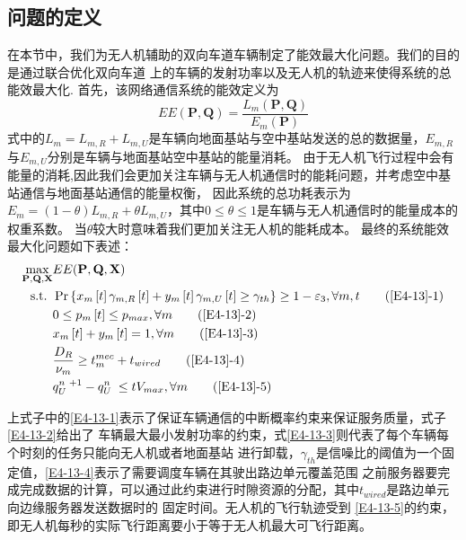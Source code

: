 \subsection{问题的定义}\label{section4-2-3}
在本节中，我们为无人机辅助的双向车道车辆制定了能效最大化问题。我们的目的是通过联合优化双向车道
上的车辆的发射功率以及无人机的轨迹来使得系统的总能效最大化.
首先，该网络通信系统的能效定义为
\begin{equation} \label{E4-12}
EE(\mathbf{P}, \mathbf{Q})=
{\frac{{{L}_{m}}\left( \mathbf{P}, \mathbf{Q} \right)}
{{{E}_{m}}\left( \mathbf{P} \right)}}
\end{equation}
式中的${{L}_{m}={L}_{m,R}+{L}_{m,U}}$是车辆向地面基站与空中基站发送的总的数据量，${E}_{m,R}$与${E}_{m,U}$分别是车辆与地面基站空中基站的能量消耗。
由于无人机飞行过程中会有能量的消耗,因此我们会更加关注车辆与无人机通信时的能耗问题，并考虑空中基站通信与地面基站通信的能量权衡，
因此系统的总功耗表示为${{E}_{m}=(1-\theta){L}_{m,R}+\theta{L}_{m,U}}$，其中$0\le \theta \le 1$是车辆与无人机通信时的能量成本的权重系数。
当$\theta$较大时意味着我们更加关注无人机的能耗成本。
最终的系统能效最大化问题如下表述：
\begin{align}
\max _{ \mathbf{P}, \mathbf{Q}, \mathbf{X} }  & EE(\mathbf{P}, \mathbf{Q}, \mathbf{X})                \label{E4-13}\\
\text { s.t. }
& \Pr\left\{x_m\left[t\right]\gamma_{m,R}\left[t\right]+
y_m\left[t\right]\gamma_{m,U}\left[t\right]\geq \gamma_{th}\right\}\geq1-
\varepsilon_3, \forall m,t                                               \tag{\ref{E4-13}{-1}}      \label{E4-13-1}\\  %
& 0\le p_m\left[t\right]\le p_{max}, \forall m                           \tag{\ref{E4-13}{-2}}      \label{E4-13-2}\\  %
& x_m\left[t\right] + y_m\left[t\right]=1, \forall m                     \tag{\ref{E4-13}{-3}}      \label{E4-13-3}\\  %
& \frac{D_R}{\nu_m} \geq t_{m}^{mec}+t_{wired}                           \tag{\ref{E4-13}{-4}}      \label{E4-13-4}\\  %
& q_U^{n\mathrm{\ }+1}-q_U^{n\mathrm{\ }}\le tV_{max}, \forall m         \tag{\ref{E4-13}{-5}}      \label{E4-13-5}    %
\end{align}

上式子中的\eqref{E4-13-1}表示了保证车辆通信的中断概率约束来保证服务质量，式子\eqref{E4-13-2}给出了
车辆最大最小发射功率的约束，式\eqref{E4-13-3}则代表了每个车辆每个时刻的任务只能向无人机或者地面基站
进行卸载，$\gamma_{th}$是信噪比的阈值为一个固定值，\eqref{E4-13-4}表示了需要调度车辆在其驶出路边单元覆盖范围
之前服务器要完成完成数据的计算，可以通过此约束进行时隙资源的分配，其中$t_{wired}$是路边单元向边缘服务器发送数据时的
固定时间。无人机的飞行轨迹受到 \eqref{E4-13-5}的约束，即无人机每秒的实际飞行距离要小于等于无人机最大可飞行距离。


